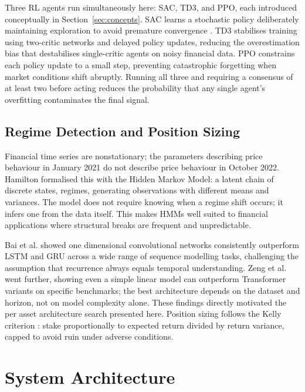 \documentclass[journal]{IEEEtran}
\begin{document}
Three RL agents run simultaneously here: SAC, TD3, and PPO, each
introduced conceptually in Section~\ref{sec:concepts}. SAC learns a
stochastic policy deliberately maintaining exploration to avoid premature
convergence \cite{sarl}. TD3 stabilises training using two-critic
networks and delayed policy updates, reducing the overestimation bias
that destabilises single-critic agents on noisy financial data. PPO
constrains each policy update to a small step, preventing catastrophic
forgetting when market conditions shift abruptly. Running all three and
requiring a consensus of at least two before acting reduces the
probability that any single agent's overfitting contaminates the final
signal.

\subsection{Regime Detection and Position Sizing}

Financial time series are nonstationary; the parameters describing price
behaviour in January 2021 do not describe price behaviour in October 2022.
Hamilton \cite{hamilton} formalised this with the Hidden Markov Model: a
latent chain of discrete states, regimes, generating observations with
different means and variances. The model does not require knowing when a
regime shift occurs; it infers one from the data itself. This makes HMMs
well suited to financial applications where structural breaks are frequent
and unpredictable.

Bai et al. \cite{tcn} showed one dimensional convolutional networks
consistently outperform LSTM and GRU across a wide range of sequence
modelling tasks, challenging the assumption that recurrence always equals
temporal understanding. Zeng et al. \cite{transformerseff} went further,
showing even a simple linear model can outperform Transformer variants on
specific benchmarks; the best architecture depends on the dataset and
horizon, not on model complexity alone. These findings directly motivated
the per asset architecture search presented here. Position sizing follows
the Kelly criterion \cite{kelly}: stake proportionally to expected return
divided by return variance, capped to avoid ruin under adverse conditions.

\section{System Architecture}
\label{sec:system}
\end{document}
